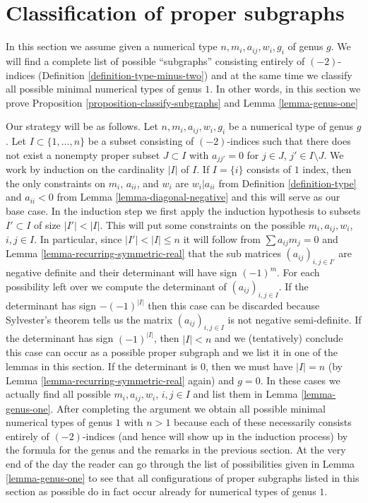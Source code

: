 \section{Classification of proper subgraphs}
\label{section-classify-proper-subgraphs}

\noindent
In this section we assume given a numerical type
$n, m_i, a_{ij}, w_i, g_i$ of genus $g$. We will find
a complete list of possible ``subgraphs'' consisting entirely
of $(-2)$-indices (Definition \ref{definition-type-minus-two}) and
at the same time we classify all possible minimal numerical
types of genus $1$. In other words, in this section we prove
Proposition \ref{proposition-classify-subgraphs} and
Lemma \ref{lemma-genus-one}

\medskip\noindent
Our strategy will be as follows. Let $n, m_i, a_{ij}, w_i, g_i$
be a numerical type of genus $g$. Let $I \subset \{1, \ldots, n\}$ be a subset
consisting of $(-2)$-indices such that there does not exist a nonempty proper
subset $J \subset I$ with $a_{jj'} = 0$ for $j \in J$, $j' \in I \setminus J$.
We work by induction on the cardinality $|I|$ of $I$. If $I = \{i\}$
consists of $1$ index, then the only constraints on $m_i$, $a_{ii}$,
and $w_i$ are $w_i | a_{ii}$ from Definition \ref{definition-type}
and $a_{ii} < 0$ from Lemma \ref{lemma-diagonal-negative}
and this will serve as our base case. In the induction step
we first apply the induction hypothesis to subsets $I' \subset I$
of size $|I'| < |I|$. This will put some constraints on the possible
$m_i, a_{ij}, w_i$, $i, j \in I$. In particular, since $|I'| < |I| \leq n$
it will follow from $\sum a_{ij}m_j = 0$ and
Lemma \ref{lemma-recurring-symmetric-real} that the
sub matrices $(a_{ij})_{i, j \in I'}$ are negative definite
and their determinant will have sign $(-1)^m$.
For each possibility left over we compute the determinant of
$(a_{ij})_{i, j \in I}$. If the determinant has sign $-(-1)^{|I|}$
then this case can be discarded because Sylvester's theorem tells
us the matrix $(a_{ij})_{i, j \in I}$ is not negative semi-definite.
If the determinant has sign $(-1)^{|I|}$, then $|I| < n$ and we
(tentatively) conclude this case can occur as a possible proper subgraph
and we list it in one of the lemmas in this section.
If the determinant is $0$, then we must have $|I| = n$
(by Lemma \ref{lemma-recurring-symmetric-real} again) and $g = 0$.
In these cases we actually find all possible $m_i, a_{ij}, w_i$, $i, j \in I$
and list them in Lemma \ref{lemma-genus-one}. After completing the
argument we obtain all possible minimal numerical types of genus
$1$ with $n > 1$ because each of these necessarily consists entirely
of $(-2)$-indices (and hence will show up in the induction process)
by the formula for the genus and the remarks in the previous section.
At the very end of the day the reader can go through the list of
possibilities given in Lemma \ref{lemma-genus-one} to see that all
configurations of proper subgraphs listed in this section as possible
do in fact occur already for numerical types of genus $1$.

